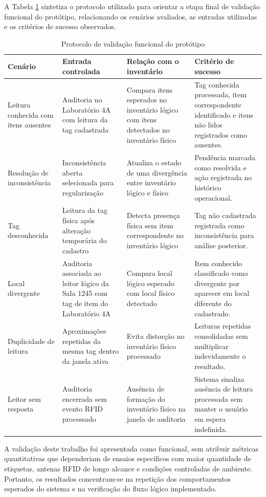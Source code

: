 A Tabela \ref{tab:protocolo-validacao} sintetiza o protocolo utilizado para orientar a etapa final de validação funcional do protótipo, relacionando os cenários avaliados, as entradas utilizadas e os critérios de sucesso observados.

\begin{table}[H]
\centering
\scriptsize
\setlength{\tabcolsep}{3pt}
\renewcommand{\arraystretch}{1.12}
\caption{Protocolo de validação funcional do protótipo}
\label{tab:protocolo-validacao}
\begin{tabularx}{\textwidth}{>{\raggedright\arraybackslash}p{2.8cm}>{\raggedright\arraybackslash}p{3.2cm}>{\raggedright\arraybackslash}p{3.1cm}>{\raggedright\arraybackslash}X}
\toprule
\textbf{Cenário} & \textbf{Entrada controlada} & \textbf{Relação com o inventário} & \textbf{Critério de sucesso} \\
\midrule
Leitura conhecida com itens ausentes & Auditoria no Laboratório 4A com leitura da tag cadastrada & Compara itens esperados no inventário lógico com itens detectados no inventário físico & Tag conhecida processada, item correspondente identificado e itens não lidos registrados como ausentes. \\
Resolução de inconsistência & Inconsistência aberta selecionada para regularização & Atualiza o estado de uma divergência entre inventário lógico e físico & Pendência marcada como resolvida e ação registrada no histórico operacional. \\
Tag desconhecida & Leitura da tag física após alteração temporária do cadastro & Detecta presença física sem item correspondente no inventário lógico & Tag não cadastrada registrada como inconsistência para análise posterior. \\
Local divergente & Auditoria associada ao leitor lógico da Sala 1245 com tag de item do Laboratório 4A & Compara local lógico esperado com local físico detectado & Item conhecido classificado como divergente por aparecer em local diferente do cadastrado. \\
Duplicidade de leitura & Aproximações repetidas da mesma tag dentro da janela ativa & Evita distorção no inventário físico processado & Leituras repetidas consolidadas sem multiplicar indevidamente o resultado. \\
Leitor sem resposta & Auditoria encerrada sem evento RFID processado & Ausência de formação do inventário físico na janela de auditoria & Sistema sinaliza ausência de leitura processada sem manter o usuário em espera indefinida. \\
\bottomrule
\end{tabularx}
\end{table}
\normalsize
\renewcommand{\arraystretch}{1}

A validação deste trabalho foi apresentada como funcional, sem atribuir métricas quantitativas que dependeriam de ensaios específicos com maior quantidade de etiquetas, antenas RFID de longo alcance e condições controladas de ambiente. Portanto, os resultados concentram-se na repetição dos comportamentos esperados do sistema e na verificação do fluxo lógico implementado.
